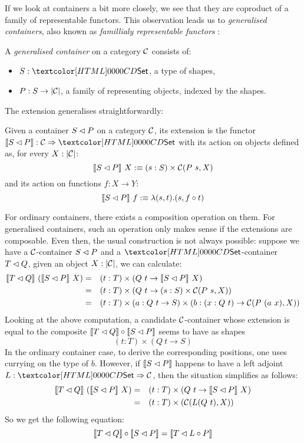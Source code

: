 If we look at containers a bit more closely, we see that they are
coproduct of a family of representable functors. This observation
leads us to \emph{generalised containers}, also known as
\emph{famillialy representable functors} \cite{Carboni1995}:
%
\begin{definition}
\label{def-gen-container}
  A \emph{generalised container} on a category $\mathcal{C}$ consists of:
  \begin{itemize}
  \item $S : \Set$, a type of shapes,
  \item $P : S \to | \mathcal{C} |$, a family of representing objects, indexed
    by the shapes.
  \end{itemize}
\end{definition}
%
The extension generalises straightforwardly:
%
\begin{definition}
  Given a container $S \lhd P$ on a category $\mathcal{C}$, its extension
  is the functor $\context{\cont{S}{P}} : \Func{\Cc}{\Set}$ with its
  action on objects defined as, for every $X : | \mathcal{C} |$:
  $$
  \llbracket S \lhd P \rrbracket\ X :\equiv (s : S) \times \mathcal{C}(P\ s, X)
  $$
  and its action on functions $f : X \to Y$:
  $$
  \llbracket S \lhd P \rrbracket\ f :\equiv \lambda (s , t) . (s , f \circ t)
  $$
\end{definition}
%
For ordinary containers, there exists a composition operation on
them. For generalised containers, such an operation only makes sense
if the extensions are composable. Even then, the usual construction is
not always possible: suppose we have a $\mathcal{C}$-container $S \lhd P$
and a $\Set$-container $T \lhd Q$, given an object $X : | \mathcal{C} |$, we can calculate:
\begin{align*}
  \context{\cont{T}{Q}}\ (\context{\cont{S}{P}}\ X) &=& &(t : T) \times (Q\ t \to \context{\cont{S}{P}}\ X) \\
  &=& &(t : T) \times (Q\ t \to (s : S) \times \Cc(P\ s, X)) \\
  &=& &(t : T) \times (a : Q\ t \to S) \times (b : (x : Q\ t) \to \Cc(P\ (a\ x), X))
\end{align*}
Looking at the above computation, a candidate $\mathcal{C}$-container whose
extension is equal to the composite
$\llbracket T \lhd Q \rrbracket \circ \llbracket S \lhd P \rrbracket$ seems to have as shapes
$$
(t : T) \times (Q\ t \to S)
$$
In the ordinary container case, to derive the corresponding positions,
one uses currying on the type of $b$. However, if
$\llbracket S \lhd P \rrbracket$ happens to have a left adjoint
$L : \Func{\Set}{\Cc}$, then the situation simplifies as follows:
\begin{align*}
  \llbracket T \lhd Q \rrbracket\ (\llbracket S \lhd P \rrbracket\ X) &=& &(t : T) \times (Q\ t \to \llbracket S \lhd P \rrbracket\ X) \\
  &=& &(t : T) \times (\mathcal{C}(L (Q\ t), X)) \\
\end{align*}
So we get the following equation:
$$
\llbracket T \lhd Q \rrbracket \circ \llbracket S \lhd P \rrbracket = \llbracket T \lhd L \circ P \rrbracket
$$

